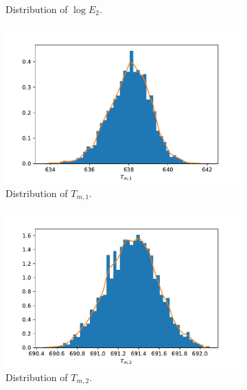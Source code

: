 \begin{figure}[h!]
\begin{subfigure}{.5\textwidth}
  \caption{Distribution of $\log E_2$.}
  \label{fig:subhistE2}
\end{subfigure}
\newline
\begin{subfigure}{.5\textwidth}
  \centering
  \includegraphics[width=\linewidth]{figures/bayesian/EXP_Q/hist_Tm1.pdf}
  \caption{Distribution of $T_{m,1}$.}
  \label{fig:subhistTm1}
\end{subfigure}%
\begin{subfigure}{.5\textwidth}
  \centering
  \includegraphics[width=\linewidth]{figures/bayesian/EXP_Q/hist_Tm2.pdf}
  \caption{Distribution of $T_{m,2}$.}
  \label{fig:subhistTm2}
\end{subfigure}
\newline
\begin{subfigure}{.5\textwidth}
  \centering

\end{subfigure}
\end{figure}
